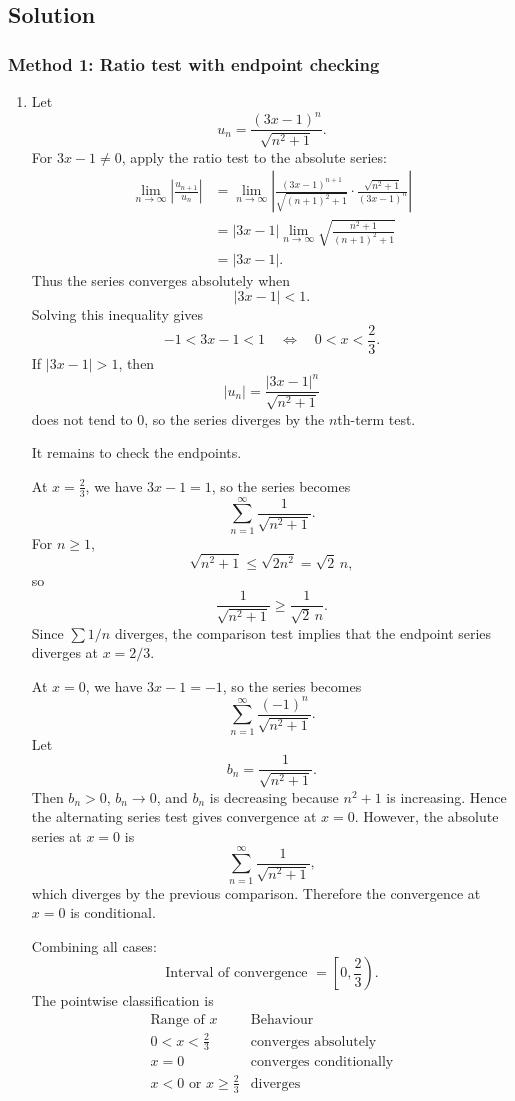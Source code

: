 \documentclass[12pt]{article}
\newcommand{\abs}[1]{\left|#1\right|}
\begin{document}
\newpage
\subsection{Solution}

\subsubsection{Method 1: Ratio test with endpoint checking}

\begin{enumerate}[label=(\alph*)]
\item Let
\[
u_n=\frac{(3x-1)^n}{\sqrt{n^2+1}}.
\]
For $3x-1\neq 0$, apply the ratio test to the absolute series:
\begin{align*}
\lim_{n\to\infty}\abs{\frac{u_{n+1}}{u_n}}
&=\lim_{n\to\infty}\abs{\frac{(3x-1)^{n+1}}{\sqrt{(n+1)^2+1}}\cdot \frac{\sqrt{n^2+1}}{(3x-1)^n}} \\
&=\abs{3x-1}\lim_{n\to\infty}\sqrt{\frac{n^2+1}{(n+1)^2+1}} \\
&=\abs{3x-1}.
\end{align*}
Thus the series converges absolutely when
\[
\abs{3x-1}<1.
\]
Solving this inequality gives
\[
-1<3x-1<1
\quad\Longleftrightarrow\quad
0<x<\frac23.
\]
If $\abs{3x-1}>1$, then
\[
\abs{u_n}=\frac{\abs{3x-1}^n}{\sqrt{n^2+1}}
\]
does not tend to $0$, so the series diverges by the $n$th-term test.

It remains to check the endpoints.

At $x=\frac23$, we have $3x-1=1$, so the series becomes
\[
\sum_{n=1}^{\infty}\frac{1}{\sqrt{n^2+1}}.
\]
For $n\geq 1$,
\[
\sqrt{n^2+1}\leq \sqrt{2n^2}=\sqrt2\,n,
\]
so
\[
\frac{1}{\sqrt{n^2+1}}\geq \frac{1}{\sqrt2\,n}.
\]
Since $\sum 1/n$ diverges, the comparison test implies that the endpoint series diverges at $x=2/3$.

At $x=0$, we have $3x-1=-1$, so the series becomes
\[
\sum_{n=1}^{\infty}\frac{(-1)^n}{\sqrt{n^2+1}}.
\]
Let
\[
b_n=\frac{1}{\sqrt{n^2+1}}.
\]
Then $b_n>0$, $b_n\to 0$, and $b_n$ is decreasing because $n^2+1$ is increasing. Hence the alternating series test gives convergence at $x=0$.
However, the absolute series at $x=0$ is
\[
\sum_{n=1}^{\infty}\frac{1}{\sqrt{n^2+1}},
\]
which diverges by the previous comparison. Therefore the convergence at $x=0$ is conditional.

Combining all cases:
\[
\boxed{\text{Interval of convergence }=\left[0,\frac23\right).}
\]
The pointwise classification is
\[
\boxed{
\begin{array}{c|c}
\text{Range of }x & \text{Behaviour} \\
\hline
0<x<\frac23 & \text{converges absolutely} \\
x=0 & \text{converges conditionally} \\
x<0\text{ or }x\geq \frac23 & \text{diverges}
\end{array}}
\]


\end{enumerate}
\end{document}

